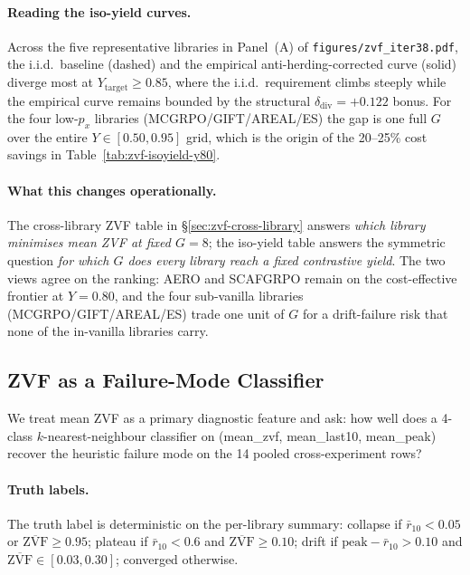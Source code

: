 \documentclass{article}
\begin{document}
\paragraph{Reading the iso-yield curves.}
Across the five representative libraries in Panel~(A) of
\texttt{figures/zvf_iter38.pdf}, the i.i.d.\ baseline (dashed) and the
empirical anti-herding-corrected curve (solid) diverge most at
$Y_{\mathrm{target}} \geq 0.85$, where the i.i.d.\ requirement climbs
steeply while the empirical curve remains bounded by the structural
$\delta_{\mathrm{div}}{=}+0.122$ bonus. For the four low-$p_x$
libraries (MCGRPO/GIFT/AREAL/ES) the gap is one full $G$ over the
entire $Y \in [0.50, 0.95]$ grid, which is the origin of the
20--25\% cost savings in Table~\ref{tab:zvf-isoyield-y80}.

\paragraph{What this changes operationally.}
The cross-library ZVF table in \S\ref{sec:zvf-cross-library} answers
\emph{which library minimises mean ZVF at fixed $G{=}8$}; the iso-yield
table answers the symmetric question \emph{for which $G$ does every
library reach a fixed contrastive yield}. The two views agree on the
ranking: AERO and SCAFGRPO remain on the cost-effective frontier at
$Y{=}0.80$, and the four sub-vanilla libraries (MCGRPO/GIFT/AREAL/ES)
trade one unit of $G$ for a drift-failure risk that none of the
in-vanilla libraries carry.

\subsection{ZVF as a Failure-Mode Classifier}
\label{sec:zvf-classifier}
We treat mean ZVF as a primary diagnostic feature and ask: how well
does a 4-class $k$-nearest-neighbour classifier on
(mean\_zvf, mean\_last10, mean\_peak) recover the
heuristic failure mode on the 14 pooled cross-experiment rows?

\paragraph{Truth labels.}
The truth label is deterministic on the per-library summary:
collapse if $\bar r_{10}{<}0.05$ or $\overline{\mathrm{ZVF}}{\geq}0.95$;
plateau if $\bar r_{10}{<}0.6$ and $\overline{\mathrm{ZVF}}{\geq}0.10$;
drift if $\mathrm{peak}{-}\bar r_{10}{>}0.10$ and $\overline{\mathrm{ZVF}}
\in [0.03, 0.30]$; converged otherwise.
\end{document}
